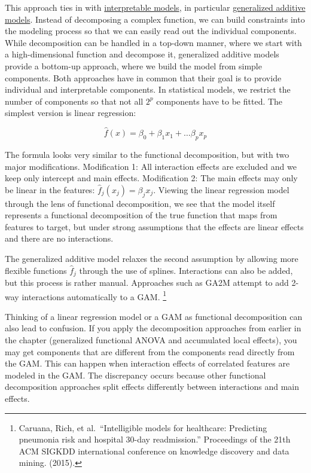 \documentclass[
  10pt,
]{scrbook}
\begin{document}
This approach ties in with \protect\hyperlink{simple}{interpretable models}, in particular \protect\hyperlink{extend-lm}{generalized additive models}.
Instead of decomposing a complex function, we can build constraints into the modeling process so that we can easily read out the individual components.
While decomposition can be handled in a top-down manner, where we start with a high-dimensional function and decompose it, generalized additive models provide a bottom-up approach, where we build the model from simple components.
Both approaches have in common that their goal is to provide individual and interpretable components.
In statistical models, we restrict the number of components so that not all \(2^p\) components have to be fitted.
The simplest version is linear regression:

\[\hat{f}(x) = \beta_0 + \beta_1 x_1 + \ldots \beta_p x_p\]

The formula looks very similar to the functional decomposition, but with two major modifications.
Modification 1: All interaction effects are excluded and we keep only intercept and main effects.
Modification 2: The main effects may only be linear in the features: \(\hat{f}_j(x_j)=\beta_j{}x_j\).
Viewing the linear regression model through the lens of functional decomposition, we see that the model itself represents a functional decomposition of the true function that maps from features to target, but under strong assumptions that the effects are linear effects and there are no interactions.

The generalized additive model relaxes the second assumption by allowing more flexible functions \(\hat{f}_j\) through the use of splines.
Interactions can also be added, but this process is rather manual.
Approaches such as GA2M attempt to add 2-way interactions automatically to a GAM. \footnote{Caruana, Rich, et al.~``Intelligible models for healthcare: Predicting pneumonia risk and hospital 30-day readmission.'' Proceedings of the 21th ACM SIGKDD international conference on knowledge discovery and data mining. (2015).}

Thinking of a linear regression model or a GAM as functional decomposition can also lead to confusion.
If you apply the decomposition approaches from earlier in the chapter (generalized functional ANOVA and accumulated local effects), you may get components that are different from the components read directly from the GAM.
This can happen when interaction effects of correlated features are modeled in the GAM.
The discrepancy occurs because other functional decomposition approaches split effects differently between interactions and main effects.
\end{document}
